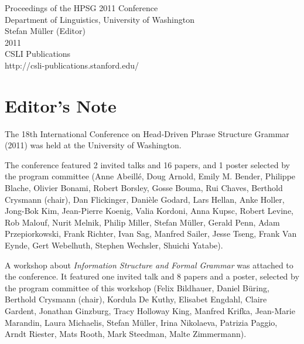 \documentclass[11pt,a4paper,fleqn]{article}
\begin{document}
\begin{center}
{\Large
                Proceedings of the HPSG 2011 Conference\\[\baselineskip]

                       Department of Linguistics, University of Washington\\[\baselineskip]

                        Stefan M{\"u}ller (Editor)\\[\baselineskip]

                                2011\\[\baselineskip]

                          CSLI Publications\\[\baselineskip]

              http://csli-publications.stanford.edu/ 
}
\end{center}
\newpage
\tableofcontents

\newpage

\section{Editor's Note}

The 18th International Conference on Head-Driven Phrase Structure Grammar (2011) was held at the University of Washington.

The conference featured 2 invited talks and 16 papers, and 1 poster selected by the program committee (Anne Abeillé,
Doug Arnold,
Emily M. Bender,
Philippe Blache,
Olivier Bonami,
Robert Borsley,
Gosse Bouma,
Rui Chaves,
Berthold Crysmann (chair),
Dan Flickinger,
Danièle Godard,
Lars Hellan,
Anke Holler,
Jong-Bok Kim,
Jean-Pierre Koenig,
Valia Kordoni,
Anna Kupsc,
Robert Levine,
Rob Malouf,
Nurit Melnik,
Philip Miller,
Stefan Müller,
Gerald Penn,
Adam Przepiorkowski,
Frank Richter,
Ivan Sag,
Manfred Sailer,
Jesse Tseng,
Frank Van Eynde,
Gert Webelhuth,
Stephen Wechsler,
Shuichi Yatabe).

A workshop about \emph{Information Structure and Formal Grammar}
was attached to the conference. It featured one invited talk and 8 papers and a poster, selected by the program
committee of this workshop (Felix Bildhauer,
Daniel Büring,
Berthold Crysmann (chair),
Kordula De Kuthy,
Elisabet Engdahl,
Claire Gardent,
Jonathan Ginzburg,
Tracy Holloway King,
Manfred Krifka,
Jean-Marie Marandin,
Laura Michaelis,
Stefan Müller,
Irina Nikolaeva,
Patrizia Paggio,
Arndt Riester,
Mats Rooth,
Mark Steedman,
Malte Zimmermann).
\end{document}
